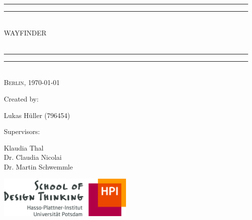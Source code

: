 \begin{titlepage}
    \textheight
    \centering
    \vspace*{\baselineskip}
    \rule{\textwidth}{1.6pt}\vspace*{-\baselineskip}\vspace*{2pt}
    \rule{\textwidth}{0.4pt}\\%
    {\Huge WAYFINDER\\
    \vspace*{12pt} %
    \LARGE \mytitle}\\[0.2\baselineskip]
    \rule{\textwidth}{0.4pt}\vspace*{-\baselineskip}\vspace{3.2pt}
    \rule{\textwidth}{1.6pt}\\[\baselineskip]
    \scshape
    Berlin, \today\par
    \vspace*{2\baselineskip}
    Created by: \\[\baselineskip]
    {\Large Lukas Hüller (796454)\par}\bigbreak Supervisors:\bigbreak 
    {\Large Klaudia Thal \\ Dr. Claudia Nicolai \\ Dr. Martin Schwemmle\par}\bigbreak\bigbreak
    \vfill
    \includegraphics[width=0.5\textwidth]{img/hpi_dschool_logo.jpg}
  \end{titlepage}